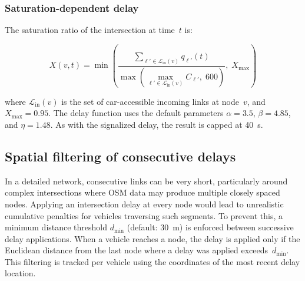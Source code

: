 \subsubsection{Saturation-dependent delay}

The saturation ratio of the intersection at time~$t$ is:

\begin{equation}
    X(v,t) = \min\!\left(\frac{\sum_{\ell' \in \mathcal{L}_{\text{in}}(v)} q_{\ell'}(t)}{\max\!\left(\max_{\ell' \in \mathcal{L}_{\text{in}}(v)} C_{\ell'}, \; 600\right)}, \; X_{\max}\right)
    \label{eq:saturation}
\end{equation}

\noindent where $\mathcal{L}_{\text{in}}(v)$ is the set of car-accessible incoming links at node~$v$, and $X_{\max} = 0.95$. The delay function uses the default parameters $\alpha = 3.5$, $\beta = 4.85$, and $\eta = 1.48$. As with the signalized delay, the result is capped at 40~s.

\subsection{Spatial filtering of consecutive delays}

In a detailed network, consecutive links can be very short, particularly around complex intersections where OSM data may produce multiple closely spaced nodes. Applying an intersection delay at every node would lead to unrealistic cumulative penalties for vehicles traversing such segments. To prevent this, a minimum distance threshold $d_{\min}$ (default: 30~m) is enforced between successive delay applications. When a vehicle reaches a node, the delay is applied only if the Euclidean distance from the last node where a delay was applied exceeds~$d_{\min}$. This filtering is tracked per vehicle using the coordinates of the most recent delay location.

